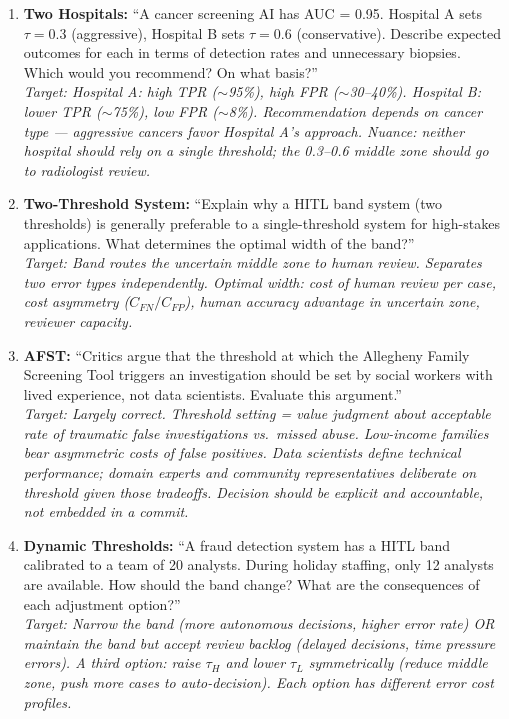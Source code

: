 \begin{enumerate}
    \item \textbf{Two Hospitals:} ``A cancer screening AI has AUC = 0.95. Hospital A sets $\tau = 0.3$ (aggressive), Hospital B sets $\tau = 0.6$ (conservative). Describe expected outcomes for each in terms of detection rates and unnecessary biopsies. Which would you recommend? On what basis?''\\
    \textit{Target: Hospital A: high TPR ($\sim$95\%), high FPR ($\sim$30--40\%). Hospital B: lower TPR ($\sim$75\%), low FPR ($\sim$8\%). Recommendation depends on cancer type --- aggressive cancers favor Hospital A's approach. Nuance: neither hospital should rely on a single threshold; the 0.3--0.6 middle zone should go to radiologist review.}

    \item \textbf{Two-Threshold System:} ``Explain why a HITL band system (two thresholds) is generally preferable to a single-threshold system for high-stakes applications. What determines the optimal width of the band?''\\
    \textit{Target: Band routes the uncertain middle zone to human review. Separates two error types independently. Optimal width: cost of human review per case, cost asymmetry ($C_{FN}/C_{FP}$), human accuracy advantage in uncertain zone, reviewer capacity.}

    \item \textbf{AFST:} ``Critics argue that the threshold at which the Allegheny Family Screening Tool triggers an investigation should be set by social workers with lived experience, not data scientists. Evaluate this argument.''\\
    \textit{Target: Largely correct. Threshold setting = value judgment about acceptable rate of traumatic false investigations vs.\ missed abuse. Low-income families bear asymmetric costs of false positives. Data scientists define technical performance; domain experts and community representatives deliberate on threshold given those tradeoffs. Decision should be explicit and accountable, not embedded in a commit.}

    \item \textbf{Dynamic Thresholds:} ``A fraud detection system has a HITL band calibrated to a team of 20 analysts. During holiday staffing, only 12 analysts are available. How should the band change? What are the consequences of each adjustment option?''\\
    \textit{Target: Narrow the band (more autonomous decisions, higher error rate) OR maintain the band but accept review backlog (delayed decisions, time pressure errors). A third option: raise $\tau_H$ and lower $\tau_L$ symmetrically (reduce middle zone, push more cases to auto-decision). Each option has different error cost profiles.}
\end{enumerate}

